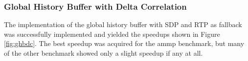 \subsubsection{Global History Buffer with Delta Correlation}
The implementation of the global history buffer with SDP and RTP as fallback was successfully implemented and yielded the speedups shown in Figure \ref{fig:ghbdc}.
The best speedup was acquired for the ammp benchmark, but many of the other benchmark showed only a slight speedup if any at all.



\begin{figure*}
    \label{fig:ghbdc}
    
    \caption{Speedup of each benchmark as a function of degree for the global history buffer with delta correlation and fall back to SDP and RTP.}
\end{figure*}
